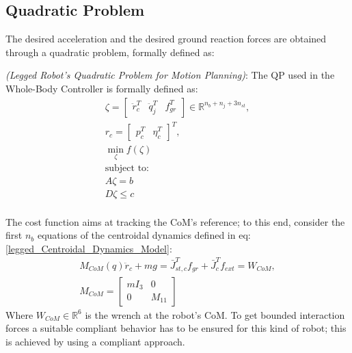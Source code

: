 \subsection{Quadratic Problem}
The desired acceleration and the desired ground reaction forces are obtained through a quadratic problem, formally defined as:
\begin{definition}\label{legged_quadratic_problem}
    \textit{(Legged Robot's Quadratic Problem for Motion Planning)}: The QP used in the Whole-Body Controller is formally defined as:
    \begin{gather*}
        \zeta=
        \begin{bmatrix}
            \ddot{r}_{c}^{T} & \ddot{q}_{j}^{T} & f_{gr}^{T}
        \end{bmatrix}\in\mathbb{R}^{n_b+n_j+3n_{st}},\\
        r_c=
        \begin{bmatrix}
            p_c^T & \eta_c^T
        \end{bmatrix}^T,\\
        \min_{\zeta} f(\zeta)\\
        \text{subject to:}\\
        A\zeta=b\\
        D\zeta\leq c\\
    \end{gather*}
\end{definition}
The cost function aims at tracking the CoM's reference; to this end, consider the first $n_b$ equations of the centroidal dynamics defined in eq:\ref{legged_Centroidal_Dynamics_Model}:
\begin{gather*}
    M_{CoM}(q)\ddot{r}_c+mg=\bar{J}_{st,c}^{T}f_{gr}+\bar{J}_{c}^{T}f_{ext}=W_{CoM},\\
    M_{CoM}=
    \begin{bmatrix}
        mI_3 & 0\\
        0 & M_{11}
    \end{bmatrix}
\end{gather*}
Where $W_{CoM}\in\mathbb{R}^{6}$ is the wrench at the robot's CoM. To get bounded interaction forces a suitable compliant behavior has to be ensured for this kind of robot; this is achieved by using a compliant approach.
